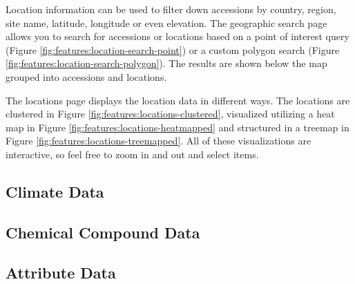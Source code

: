 Location information can be used to filter down accessions by country, region, site name, latitude, longitude or even elevation. The geographic search page allows you to search for accessions or locations based on a point of interest query (Figure \ref{fig:features:location-search-point}) or a custom polygon search (Figure \ref{fig:features:location-search-polygon}). The results are shown below the map grouped into accessions and locations.

The locations page displays the location data in different ways. The locations are clustered in Figure \ref{fig:features:locations-clustered}, visualized utilizing a heat map in Figure \ref{fig:features:locations-heatmapped} and structured in a treemap in Figure \ref{fig:features:locations-treemapped}. All of these visualizations are interactive, so feel free to zoom in and out and select items.

\subsection{Climate Data}

\subsection{Chemical Compound Data}

\subsection{Attribute Data}
\label{sec:data:attributes}